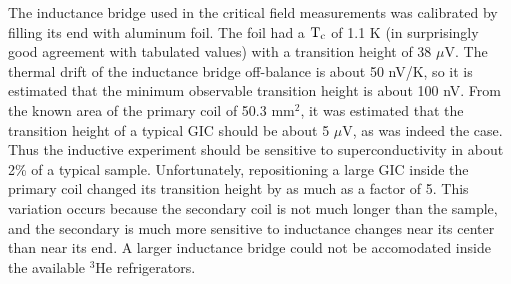         The inductance  bridge used  in the critical field measurements was
calibrated by filling its end with aluminum foil.  The foil had a $\rm T_c$
of    1.1 K    (in      surprisingly   good   agreement    with   tabulated
values\cite{ashcroft76})  with  a  transition height   of 38 $\mu$V.    The
thermal drift of the inductance bridge off-balance  is about 50 nV/K, so it
is estimated that the minimum observable transition height is about 100 nV.
From the known area  of  the primary coil  of 50.3 mm$^2$, it was estimated
that the transition height of a  typical  GIC should be  about 5 $\mu$V, as
was indeed the case.  Thus the  inductive experiment should be sensitive to
superconductivity in  about   2\%  of  a  typical sample.    Unfortunately,
repositioning a  large  GIC inside the  primary coil changed its transition
height  by as  much as a  factor of 5.  This  variation occurs because  the
secondary coil  is not much longer than  the sample,  and the  secondary is
much  more  sensitive to inductance changes near  its  center than near its
end.  A   larger  inductance bridge  could not  be accomodated  inside  the
available $^3$He refrigerators.


